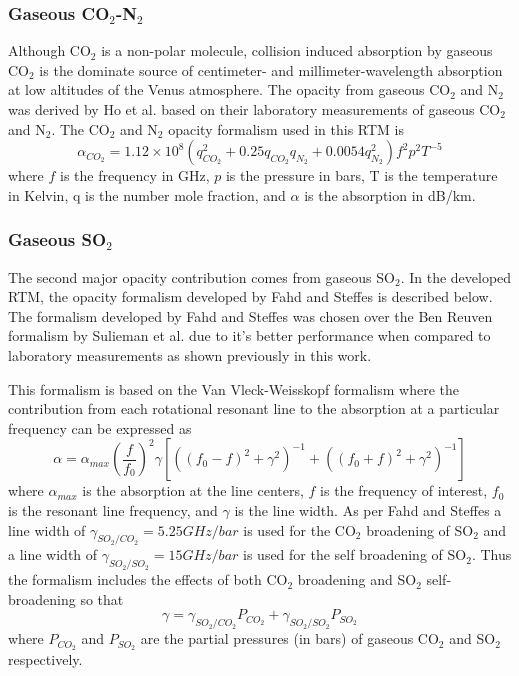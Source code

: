 \subsubsection{Gaseous CO$_2$-N$_2$}
Although CO$_2$ is a non-polar molecule, collision induced absorption by gaseous CO$_2$ \cite{Barrett-1960} is the dominate source of centimeter- and millimeter-wavelength absorption at low altitudes of the Venus atmosphere. The opacity from gaseous CO$_2$ and N$_2$  was derived by Ho et al. \cite{Ho-1966} based on their laboratory measurements of gaseous CO$_2$ and N$_2$. The CO$_2$ and N$_2$ opacity formalism used in this RTM is
\begin{equation}\label{eq:rtm-co2n2}
\alpha_{CO_2} = 1.12\times 10^8(q_{CO_2}^2 + 0.25q_{CO_2}q_{N_2} + 0.0054q_{N_2}^2)f^2p^2T^{-5}
\end{equation}
where $f$ is the frequency in GHz, $p$ is the pressure in bars, T is the temperature in Kelvin, q is the number mole fraction, and $\alpha$ is the absorption in dB/km.

\subsubsection{Gaseous SO$_2$}
The second major opacity contribution comes from gaseous SO$_2$. In the developed RTM, the opacity formalism developed by Fahd and Steffes \cite{Fahd-1991} is described below. The formalism developed by Fahd and Steffes was chosen over the Ben Reuven formalism by Sulieman et al. \cite{Suleiman-1996} due to it's better performance when compared to laboratory measurements as shown previously in this work.

This formalism is based on the Van Vleck-Weisskopf formalism where the contribution from each rotational resonant line to the absorption at a particular frequency can be expressed as 
\begin{equation}
\label{eq:rtm-so2fahd}
\alpha = \alpha_{max} \left(\frac{f}{f_0}\right)^2 \gamma [((f_0-f)^2+\gamma^2)^{-1}+((f_0+f)^2 + \gamma^2)^{-1}]
\end{equation}
where $\alpha_{max}$ is the absorption at the line centers, $f$ is the frequency of interest, $f_0$ is the resonant line frequency, and $\gamma$ is the line width. As per Fahd and Steffes \cite{Fahd-1991} a line width of $\gamma_{SO_2/CO_2} = 5.25GHz/bar$ is used for the CO$_2$ broadening of SO$_2$ and a line width of $\gamma_{SO_2/SO_2} = 15GHz/bar$ is used for the self broadening of SO$_2$. Thus the formalism includes the effects of both CO$_2$ broadening and SO$_2$ self-broadening so that
\begin{equation}
\gamma = \gamma_{SO_2/CO_2}P_{CO_2} + \gamma_{SO_2/SO_2}P_{SO_2}
\end{equation}
where $P_{CO_2}$ and $P_{SO_2}$ are the partial pressures (in bars) of gaseous CO$_2$ and SO$_2$ respectively.

